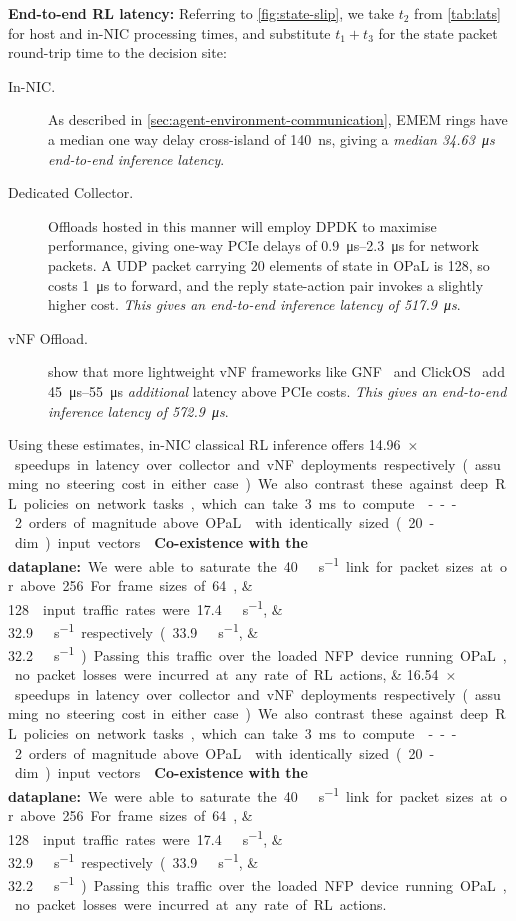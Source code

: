\documentclass[
sigconf,natbib=false
]{acmart}
\newcommand{\fakepara}[1]{\noindent\textbf{#1:}}
\newcommand{\approachshort}{OPaL}
\begin{document}
\fakepara{End-to-end RL latency}
Referring to \cref{fig:state-slip}, we take $t_2$ from \cref{tab:lats} for host and in-NIC processing times, and substitute $t_1+t_3$ for the state packet round-trip time to the decision site:
\begin{description}
	\item[In-NIC.] As described in \cref{sec:agent-environment-communication}, EMEM rings have a median one way delay cross-island of \SI{140}{\nano\second}, giving a \emph{median \SI{34.63}{\micro\second} end-to-end inference latency}.
	\item[Dedicated Collector.] Offloads hosted in this manner will employ DPDK to maximise performance, giving one-way PCIe delays of \SIrange{0.9}{2.3}{\micro\second} for network packets.
	A UDP packet carrying \num{20} elements of state in \approachshort{} is \SI{128}{\byte}, so costs \SI{1}{\micro\second} to forward, and the reply state-action pair invokes a slightly higher cost.
	\emph{This gives an end-to-end inference latency of \SI{517.9}{\micro\second}}.
	\item[vNF Offload.] \Textcite{DBLP:journals/cm/CzivaP17} show that more lightweight vNF frameworks like GNF~\parencite{DBLP:journals/cm/CzivaP17} and ClickOS~\parencite{DBLP:conf/nsdi/MartinsAROHBH14} add \SIrange{45}{55}{\micro\second} \emph{additional} latency above PCIe costs.
	\emph{This gives an end-to-end inference latency of \SI{572.9}{\micro\second}}.
\end{description}
Using these estimates, in-NIC classical RL inference offers \SIlist{14.96;16.54}{$\times$} speedups in latency over collector and vNF deployments respectively (assuming no steering cost in either case).
We also contrast these against deep RL policies on network tasks, which can take \SI{3}{\milli\second} to compute~\parencite{DBLP:journals/corr/abs-1910-04054}---2 orders of magnitude above \approachshort{} with identically sized (20-dim) input vectors.

\fakepara{Co-existence with the dataplane}
We were able to saturate the \SI{40}{\giga\bit\per\second} link for packet sizes at or above \SI{256}{\byte}.
For frame sizes of \SIlist{64;128}{\byte} input traffic rates were \SIlist{17.4;32.9}{\giga\bit\per\second} respectively (\SIlist[per-symbol=p,sticky-per=true]{33.9;32.2}{\mega\packet\per\second}).
Passing this traffic over the loaded NFP device running \approachshort, no packet losses were incurred at any rate of RL actions.
\end{document}
